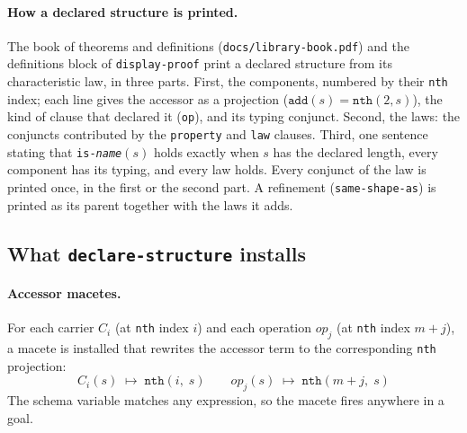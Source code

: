 \paragraph{How a declared structure is printed.}
The book of theorems and definitions (\texttt{docs/library-book.pdf}) and the
definitions block of \texttt{display-proof} print a declared structure from its
characteristic law, in three parts.  First, the components, numbered by their
\texttt{nth} index; each line gives the accessor as a projection
($\mathtt{add}(s) = \mathtt{nth}(2, s)$), the kind of clause that declared it
(\texttt{op}), and its typing conjunct.  Second, the laws: the conjuncts
contributed by the \texttt{property} and \texttt{law} clauses.  Third, one
sentence stating that \texttt{is-\textit{name}}$(s)$ holds exactly when $s$ has the
declared length, every component has its typing, and every law holds.  Every
conjunct of the law is printed once, in the first or the second part.  A
refinement (\texttt{same-shape-as}) is printed as its parent together with the
laws it adds.

\subsection{What \texttt{declare-structure} installs}

\paragraph{Accessor macetes.}
For each carrier $C_i$ (at \texttt{nth} index $i$) and each operation
$\mathit{op}_j$ (at \texttt{nth} index $m+j$), a macete is installed that
rewrites the accessor term to the corresponding \texttt{nth} projection:
\[
  C_i(s) \;\longmapsto\; \texttt{nth}(i,\; s)
  \qquad
  \mathit{op}_j(s) \;\longmapsto\; \texttt{nth}(m{+}j,\; s)
\]
The schema variable matches any expression, so the macete fires anywhere
in a goal.

